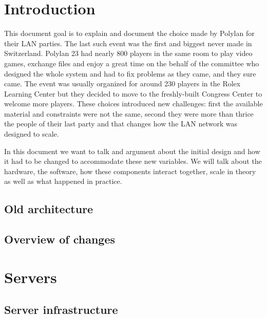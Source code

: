 \documentclass[a4paper,12pt]{article}
\begin{document}
\section{Introduction}
This document goal is to explain and document the choice made by Polylan for their LAN parties.
The last such event was the first and biggest never made in Switzerland.
Polylan 23 had nearly 800 players in the same room to play video games, exchange files and enjoy a great time on the behalf of the committee who designed the whole system and had to fix problems as they came, and they sure came.
The event was usually organized for around 230 players in the Rolex Learning Center but they decided to move to the freshly-built Congress Center to welcome more players.
These choices introduced new challenges: first the available material and constraints were not the same, second they were more than thrice the people of their last party and that changes how the LAN network was designed to scale.

In this document we want to talk and argument about the initial design and how it had to be changed to accommodate these new variables.
We will talk about the hardware, the software, how these components interact together, scale in theory as well as what happened in practice.


\subsection{Old architecture}

\subsection{Overview of changes}


\section{Servers}

\subsection{Server infrastructure}
\end{document}
